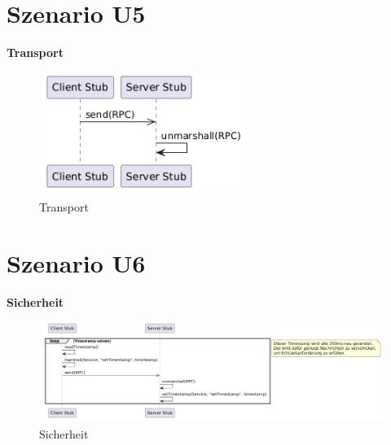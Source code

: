 \section{Szenario U5}
\textbf{Transport}\\
\begin{figure}[h!]
	\centering
	\includegraphics[width=0.8\linewidth]{diagrams/Transport.png}
	\caption{Transport}
	\label{fig:Transport}
\end{figure}
\clearpage

\section{Szenario U6}
\textbf{Sicherheit}\\
\begin{figure}[h!]
	\centering
	\includegraphics[width=0.8\linewidth]{diagrams/Sicherheit.png}
	\caption{Sicherheit}
	\label{fig:Sicherheit}
\end{figure}
\clearpage


